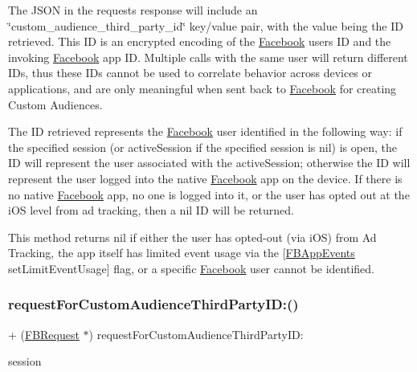 The J\+S\+ON in the request\textquotesingle{}s response will include an \char`\"{}custom\+\_\+audience\+\_\+third\+\_\+party\+\_\+id\char`\"{} key/value pair, with the value being the ID retrieved. This ID is an encrypted encoding of the \hyperlink{interfaceFacebook}{Facebook} user\textquotesingle{}s ID and the invoking \hyperlink{interfaceFacebook}{Facebook} app ID. Multiple calls with the same user will return different I\+Ds, thus these I\+Ds cannot be used to correlate behavior across devices or applications, and are only meaningful when sent back to \hyperlink{interfaceFacebook}{Facebook} for creating Custom Audiences.

The ID retrieved represents the \hyperlink{interfaceFacebook}{Facebook} user identified in the following way\+: if the specified session (or active\+Session if the specified session is {\ttfamily nil}) is open, the ID will represent the user associated with the active\+Session; otherwise the ID will represent the user logged into the native \hyperlink{interfaceFacebook}{Facebook} app on the device. If there is no native \hyperlink{interfaceFacebook}{Facebook} app, no one is logged into it, or the user has opted out at the i\+OS level from ad tracking, then a {\ttfamily nil} ID will be returned.

This method returns {\ttfamily nil} if either the user has opted-\/out (via i\+OS) from Ad Tracking, the app itself has limited event usage via the {\ttfamily \mbox{[}\hyperlink{interfaceFBAppEvents}{F\+B\+App\+Events} set\+Limit\+Event\+Usage\mbox{]}} flag, or a specific \hyperlink{interfaceFacebook}{Facebook} user cannot be identified. \mbox{\label{interfaceFBRequest_a17f11f5dad042b4109b3a001300d6916}} 
\subsubsection{\texorpdfstring{request\+For\+Custom\+Audience\+Third\+Party\+I\+D\+:()}{requestForCustomAudienceThirdPartyID:()}\hspace{0.1cm}{\footnotesize\ttfamily [2/5]}}
{\footnotesize\ttfamily + (\hyperlink{interfaceFBRequest}{F\+B\+Request} $\ast$) request\+For\+Custom\+Audience\+Third\+Party\+I\+D\+: \begin{DoxyParamCaption}\item[{(\hyperlink{interfaceFBSession}{F\+B\+Session} $\ast$)}]{session }\end{DoxyParamCaption}}


